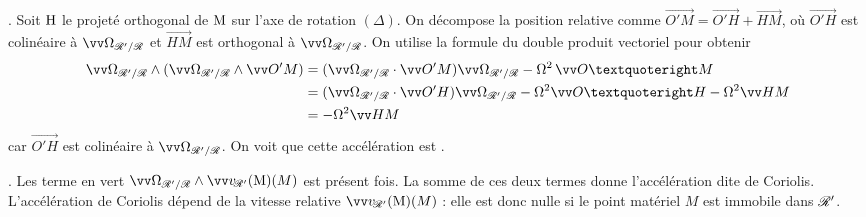\documentclass[12pt,fancy]{cours}
\begin{document}
\begin{liste}
  \item {}. Soit $\rm H$ le projeté orthogonal de $\rm M$ sur l'axe de rotation $(\Delta)$.
  On décompose la position relative comme $\Vec{O'M} = \Vec{O'H} + \Vec{HM}$, où $\Vec{O'H}$ est colinéaire à $\OR$ et $\Vec{HM}$ est orthogonal à $\OR$. On utilise la formule du double produit vectoriel pour obtenir
  \begin{equation}
  \begin{split}
    \OR \pv  (\OR \pv \Vec{O'M}) & = (\OR \cdot \Vec{O'M}) \OR - \Omega^2\,\Vec{O’M} \\ & =  (\OR \cdot \Vec{O'H}) \OR   -  \Omega^2 \Vec{O’H} -\Omega^{2} \Vec {HM} \\ 
    & = -\Omega^{2} \Vec {HM}
  \end{split}
  \end{equation}
  car $\Vec{O'H}$ est colinéaire à $\OR$. On voit que cette accélération est .
 \item {}. Les terme en vert $\OR \pv  \vRp(M)$ est présent  fois. La somme de ces deux termes donne l'accélération dite de Coriolis. L'accélération de Coriolis dépend de la vitesse relative $\vRp(M)$ : elle est donc nulle si le point matériel $M$ est immobile dans $\mathcal{R}'$.
\end{liste}
\end{document}

